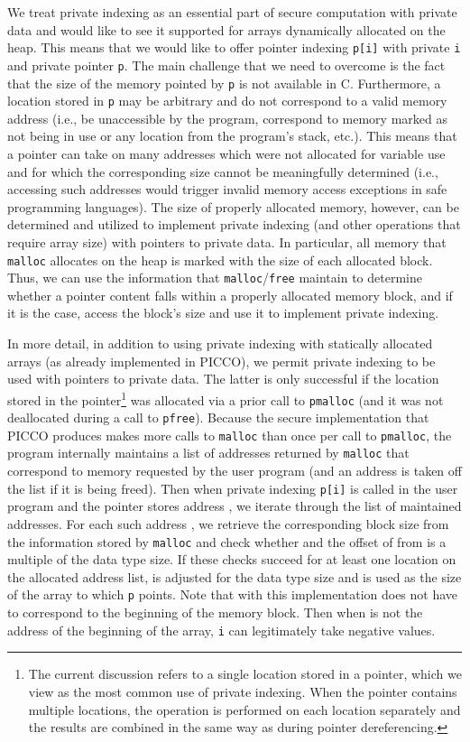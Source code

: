 \documentclass[11pt]{article}
\begin{document}
We treat private indexing as an essential part of secure computation with
private data and would like to see it supported for arrays dynamically
allocated on the heap. This means that we would like to offer pointer
indexing \texttt{p[i]} with private \texttt{i} and private pointer
\texttt{p}. The main challenge that we need to overcome is the fact that the
size of the memory pointed by \texttt{p} is not available in C. Furthermore,
a location stored in \texttt{p} may be arbitrary and do not correspond to a
valid memory address (i.e., be unaccessible by the program, correspond to
memory marked as not being in use or any location from the program's stack,
etc.). This means that a pointer can take on many addresses which were not
allocated for variable use and for which the corresponding size cannot be
meaningfully determined (i.e., accessing such addresses would trigger
invalid memory access exceptions in safe programming languages). The size of
properly allocated memory, however, can be determined and utilized to
implement private indexing (and other operations that require array size)
with pointers to private data. In particular, all memory that
\texttt{malloc} allocates on the heap is marked with the size of each
allocated block. Thus, we can use the information that
\texttt{malloc}/\texttt{free} maintain to determine whether a pointer
content falls within a properly allocated memory block, and if it is the
case, access the block's size and use it to implement private indexing.

In more detail, in addition to using private indexing with statically
allocated arrays (as already implemented in PICCO), we permit private
indexing to be used with pointers to private data. The latter is only
successful if the location stored in the pointer\footnote{The current
discussion refers to a single location stored in a pointer, which we view as
the most common use of private indexing. When the pointer contains multiple
locations, the operation is performed on each location separately and the
results are combined in the same way as during pointer dereferencing.} was
allocated via a prior call to \texttt{pmalloc} (and it was not deallocated
during a call to \texttt{pfree}). Because the secure implementation that
PICCO produces makes more calls to \texttt{malloc} than once per call to
\texttt{pmalloc}, the program internally maintains a list of addresses
returned by \texttt{malloc} that correspond to memory requested by the user
program (and an address is taken off the list if it is being freed). Then
when private indexing \texttt{p[i]} is called in the user program and the
pointer stores address , we iterate through the list of maintained
addresses. For each such address , we retrieve the corresponding block
size  from the information stored by \texttt{malloc} and check whether  and the offset of  from  is a multiple of the data
type size. If these checks succeed for at least one location on the
allocated address list,  is adjusted for the data type size and is used
as the size of the array to which \texttt{p} points. Note that with this
implementation  does not have to correspond to the beginning of the
memory block. Then when  is not the address of the beginning of the
array, \texttt{i} can legitimately take negative values.
\end{document}
